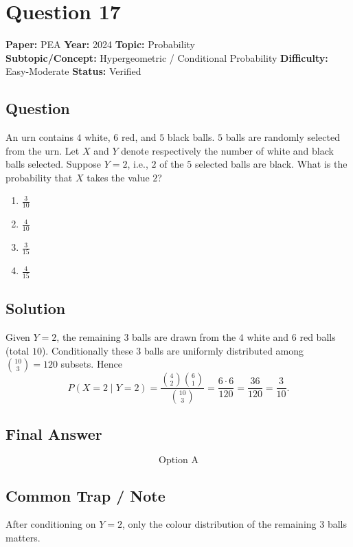 \documentclass[11pt]{article}
\begin{document}
\section*{Question 17}
\textbf{Paper:} PEA \quad \textbf{Year:} 2024 \quad \textbf{Topic:} Probability \\
\textbf{Subtopic/Concept:} Hypergeometric / Conditional Probability \quad \textbf{Difficulty:} Easy-Moderate \quad \textbf{Status:} Verified

\subsection*{Question}
An urn contains $4$ white, $6$ red, and $5$ black balls. $5$ balls are randomly selected from the urn. Let $X$ and $Y$ denote respectively the number of white and black balls selected. Suppose $Y=2$, i.e., $2$ of the $5$ selected balls are black. What is the probability that $X$ takes the value $2$?
\begin{enumerate}[label=(\Alph*)]
\item $\tfrac{3}{10}$
\item $\tfrac{4}{10}$
\item $\tfrac{3}{15}$
\item $\tfrac{4}{15}$
\end{enumerate}

\subsection*{Solution}
Given $Y=2$, the remaining $3$ balls are drawn from the $4$ white and $6$ red balls (total $10$). Conditionally these $3$ balls are uniformly distributed among $\binom{10}{3}=120$ subsets. Hence
\[
P(X=2\mid Y=2)=\frac{\binom{4}{2}\binom{6}{1}}{\binom{10}{3}}=\frac{6\cdot 6}{120}=\frac{36}{120}=\frac{3}{10}.
\]

\subsection*{Final Answer}
\[
\boxed{\text{Option A}}
\]

\subsection*{Common Trap / Note}
After conditioning on $Y=2$, only the colour distribution of the remaining $3$ balls matters.

\end{document}
